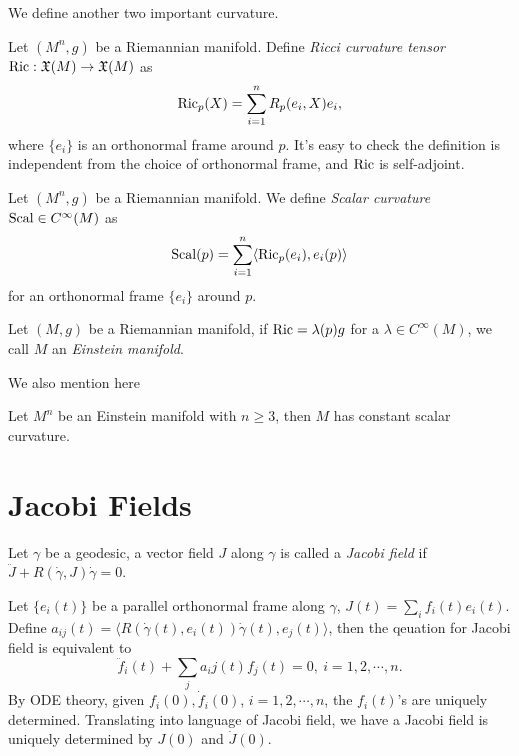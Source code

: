 We define another two important curvature.
\begin{defn}
    Let $(M^n,g)$ be a Riemannian manifold.
    Define \emph{Ricci curvature tensor} $\operatorname{Ric}:\mathfrak{X}(M)\to\mathfrak{X}(M)$ as
    \[\operatorname{Ric}_p(X)=\sum_{i=1}^nR_p(e_i,X)e_i,\]
    where $\{e_i\}$ is an orthonormal frame around $p$.
    It's easy to check the definition is independent from the choice of orthonormal frame, and $\operatorname{Ric}$ is self-adjoint.
\end{defn}

\begin{defn}
    Let $(M^n,g)$ be a Riemannian manifold.
    We define \emph{Scalar curvature} $\operatorname{Scal}\in C^\infty(M)$ as
    \[\operatorname{Scal}(p)=\sum_{i=1}^n\langle\operatorname{Ric}_p(e_i),e_i(p)\rangle\]
    for an orthonormal frame $\{e_i\}$ around $p$.
\end{defn}

\begin{defn}
    Let $(M,g)$ be a Riemannian manifold, if $\operatorname{Ric}=\lambda(p)g$ for a $\lambda\in C^\infty(M)$, we call $M$ an \emph{Einstein manifold}.
\end{defn}

We also mention here
\begin{thm}[Schur]
    Let $M^n$ be an Einstein manifold with $n\geq 3$, then $M$ has constant scalar curvature.    
\end{thm}

\section{Jacobi Fields}

\begin{defn}
    Let $\gamma$ be a geodesic, a vector field $J$ along $\gamma$ is called a \emph{Jacobi field} if $\ddot{J}+R(\dot{\gamma},J)\dot{\gamma}=0$.
\end{defn}

Let $\{e_i(t)\}$ be a parallel orthonormal frame along $\gamma$, $J(t)=\sum_if_i(t)e_i(t)$.
Define $a_{ij}(t)=\langle R(\dot{\gamma}(t),e_i(t))\dot{\gamma}(t),e_j(t)\rangle$, then the qeuation for Jacobi field is equivalent to
\[\ddot{f}_i(t)+\sum_ja_ij(t)f_j(t)=0,\ i=1,2,\cdots,n.\]
By ODE theory, given $f_i(0),\dot{f}_i(0)$, $i=1,2,\cdots,n$, the $f_i(t)$'s are uniquely determined.
Translating into language of Jacobi field, we have a Jacobi field is uniquely determined by $J(0)$ and $\dot{J}(0)$.

